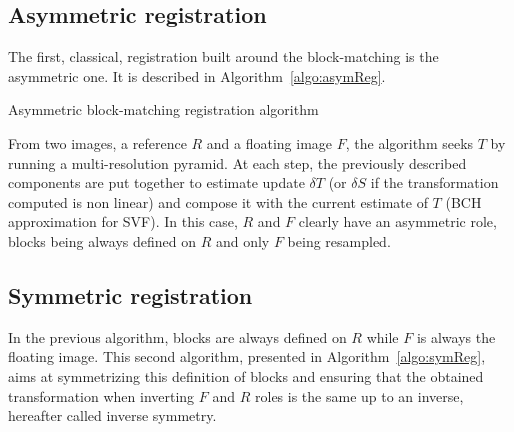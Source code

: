 \documentclass[a4paper]{article}
\begin{document}
\subsection{Asymmetric registration} %
\label{sub:asymmetric_registration}

The first, classical, registration built around the block-matching is the asymmetric one. It is described in Algorithm~\ref{algo:asymReg}.

\begin{algorithm}[!htbp]
\caption{Asymmetric block-matching registration algorithm}
\label{algo:asymReg}
\begin{algorithmic}[1]
    \ENDFOR
  \ENDFOR
\end{algorithmic}
\end{algorithm}
From two images, a reference $R$ and a floating image $F$, the algorithm seeks $T$ by running a multi-resolution pyramid. At each step, the previously described components are put together to estimate update $\delta T$ (or $\delta S$ if the transformation computed is non linear) and compose it with the current estimate of $T$ (BCH approximation for SVF). In this case, $R$ and $F$ clearly have an asymmetric role, blocks being always defined on $R$ and only $F$ being resampled.


\subsection{Symmetric registration} %
\label{sub:symmetric_registration}

In the previous algorithm, blocks are always defined on $R$ while $F$ is always the floating image. This second algorithm, presented in Algorithm~\ref{algo:symReg}, aims at symmetrizing this definition of blocks and ensuring that the obtained transformation when inverting $F$ and $R$ roles is the same up to an inverse, hereafter called inverse symmetry.
\end{document}
